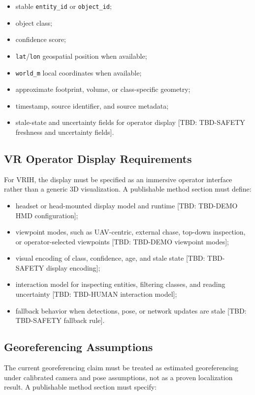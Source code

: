 \documentclass[11pt,a4paper]{article}
\newcommand{\tbd}[1]{\textcolor{publicationred}{[TBD: #1]}}
\newcommand{\code}[1]{\texttt{#1}}
\begin{document}
\begin{itemize}
    \item stable \code{entity\_id} or \code{object\_id};
    \item object class;
    \item confidence score;
    \item \code{lat}/\code{lon} geospatial position when available;
    \item \code{world\_m} local coordinates when available;
    \item approximate footprint, volume, or class-specific geometry;
    \item timestamp, source identifier, and source metadata;
    \item stale-state and uncertainty fields for operator display \tbd{TBD-SAFETY freshness and uncertainty fields}.
\end{itemize}

\subsection{VR Operator Display Requirements}

For VRIH, the display must be specified as an immersive operator interface rather than a generic 3D visualization. A publishable method section must define:

\begin{itemize}
    \item headset or head-mounted display model and runtime \tbd{TBD-DEMO HMD configuration};
    \item viewpoint modes, such as UAV-centric, external chase, top-down inspection, or operator-selected viewpoints \tbd{TBD-DEMO viewpoint modes};
    \item visual encoding of class, confidence, age, and stale state \tbd{TBD-SAFETY display encoding};
    \item interaction model for inspecting entities, filtering classes, and reading uncertainty \tbd{TBD-HUMAN interaction model};
    \item fallback behavior when detections, pose, or network updates are stale \tbd{TBD-SAFETY fallback rule}.
\end{itemize}

\subsection{Georeferencing Assumptions}

The current georeferencing claim must be treated as estimated georeferencing under calibrated camera and pose assumptions, not as a proven localization result. A publishable method section must specify:
\end{document}
